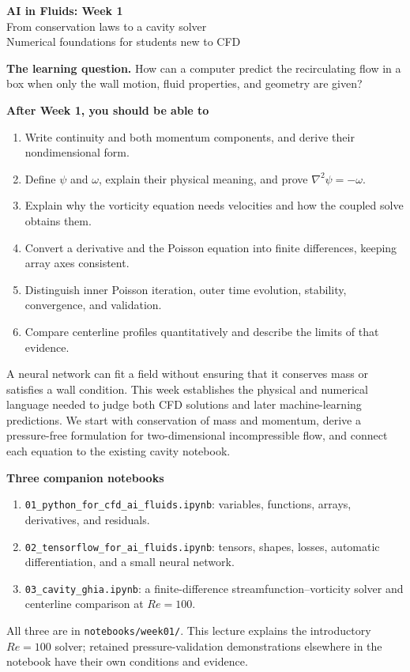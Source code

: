 \documentclass[11pt]{article}
\begin{document}
\begin{center}
{\color{accent}\LARGE\bfseries AI in Fluids: Week 1}\\[8pt]
{\Large From conservation laws to a cavity solver}\\[6pt]
{\large Numerical foundations for students new to CFD}
\end{center}
\vspace{8pt}
\textbf{The learning question.} How can a computer predict the recirculating flow in a box when only the wall motion, fluid properties, and geometry are given?

\textbf{After Week 1, you should be able to}
\begin{enumerate}
\item Write continuity and both momentum components, and derive their nondimensional form.
\item Define $\psi$ and $\omega$, explain their physical meaning, and prove $\nabla^2\psi=-\omega$.
\item Explain why the vorticity equation needs velocities and how the coupled solve obtains them.
\item Convert a derivative and the Poisson equation into finite differences, keeping array axes consistent.
\item Distinguish inner Poisson iteration, outer time evolution, stability, convergence, and validation.
\item Compare centerline profiles quantitatively and describe the limits of that evidence.
\end{enumerate}

A neural network can fit a field without ensuring that it conserves mass or satisfies a wall condition. This week establishes the physical and numerical language needed to judge both CFD solutions and later machine-learning predictions. We start with conservation of mass and momentum, derive a pressure-free formulation for two-dimensional incompressible flow, and connect each equation to the existing cavity notebook.

\textbf{Three companion notebooks}
\begin{enumerate}
\item \texttt{01\_python\_for\_cfd\_ai\_fluids.ipynb}: variables, functions, arrays, derivatives, and residuals.
\item \texttt{02\_tensorflow\_for\_ai\_fluids.ipynb}: tensors, shapes, losses, automatic differentiation, and a small neural network.
\item \texttt{03\_cavity\_ghia.ipynb}: a finite-difference streamfunction--vorticity solver and centerline comparison at $Re=100$.
\end{enumerate}
All three are in \texttt{notebooks/week01/}. This lecture explains the introductory $Re=100$ solver; retained pressure-validation demonstrations elsewhere in the notebook have their own conditions and evidence.
\end{document}
